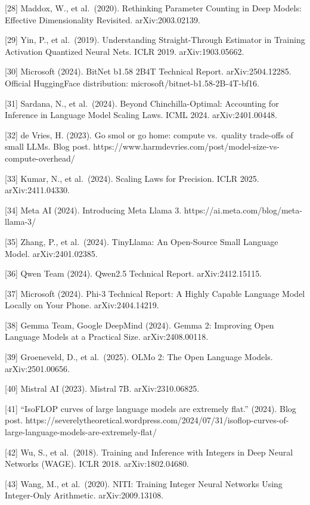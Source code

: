 {[}28{]} Maddox, W., et al.~(2020). Rethinking Parameter Counting in
Deep Models: Effective Dimensionality Revisited. arXiv:2003.02139.

{[}29{]} Yin, P., et al.~(2019). Understanding Straight-Through
Estimator in Training Activation Quantized Neural Nets. ICLR 2019.
arXiv:1903.05662.

{[}30{]} Microsoft (2024). BitNet b1.58 2B4T Technical Report.
arXiv:2504.12285. Official HuggingFace distribution:
microsoft/bitnet-b1.58-2B-4T-bf16.

{[}31{]} Sardana, N., et al.~(2024). Beyond Chinchilla-Optimal:
Accounting for Inference in Language Model Scaling Laws. ICML 2024.
arXiv:2401.00448.

{[}32{]} de Vries, H. (2023). Go smol or go home: compute vs.~quality
trade-offs of small LLMs. Blog post.
https://www.harmdevries.com/post/model-size-vs-compute-overhead/

{[}33{]} Kumar, N., et al.~(2024). Scaling Laws for Precision. ICLR
2025. arXiv:2411.04330.

{[}34{]} Meta AI (2024). Introducing Meta Llama 3.
https://ai.meta.com/blog/meta-llama-3/

{[}35{]} Zhang, P., et al.~(2024). TinyLlama: An Open-Source Small
Language Model. arXiv:2401.02385.

{[}36{]} Qwen Team (2024). Qwen2.5 Technical Report. arXiv:2412.15115.

{[}37{]} Microsoft (2024). Phi-3 Technical Report: A Highly Capable
Language Model Locally on Your Phone. arXiv:2404.14219.

{[}38{]} Gemma Team, Google DeepMind (2024). Gemma 2: Improving Open
Language Models at a Practical Size. arXiv:2408.00118.

{[}39{]} Groeneveld, D., et al.~(2025). OLMo 2: The Open Language
Models. arXiv:2501.00656.

{[}40{]} Mistral AI (2023). Mistral 7B. arXiv:2310.06825.

{[}41{]} ``IsoFLOP curves of large language models are extremely flat.''
(2024). Blog post.
https://severelytheoretical.wordpress.com/2024/07/31/isoflop-curves-of-large-language-models-are-extremely-flat/

{[}42{]} Wu, S., et al.~(2018). Training and Inference with Integers in
Deep Neural Networks (WAGE). ICLR 2018. arXiv:1802.04680.

{[}43{]} Wang, M., et al.~(2020). NITI: Training Integer Neural Networks
Using Integer-Only Arithmetic. arXiv:2009.13108.

